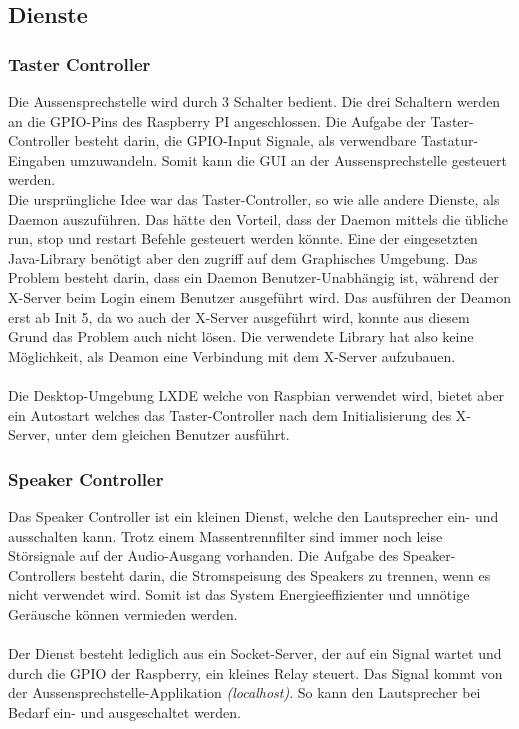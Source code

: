 \subsection{Dienste}
\label{kap:dienste}

\subsubsection{Taster Controller}
Die Aussensprechstelle wird durch 3 Schalter bedient. Die drei Schaltern werden an die GPIO-Pins des Raspberry PI angeschlossen. Die Aufgabe der Taster-Controller besteht darin, die GPIO-Input Signale, als verwendbare Tastatur-Eingaben umzuwandeln. Somit kann die GUI an der Aussensprechstelle gesteuert werden.
\\
Die ursprüngliche Idee war das Taster-Controller, so wie alle andere Dienste, als Daemon auszuführen. Das hätte den Vorteil, dass der Daemon mittels die übliche run, stop und restart Befehle gesteuert werden könnte. Eine der eingesetzten Java-Library benötigt aber den zugriff auf dem Graphisches Umgebung. Das Problem besteht darin, dass ein Daemon Benutzer-Unabhängig ist, während der X-Server beim Login einem Benutzer ausgeführt wird. Das ausführen der Deamon erst ab Init 5, da wo auch der X-Server ausgeführt wird, konnte aus diesem Grund das Problem auch nicht lösen.
Die verwendete Library hat also keine Möglichkeit, als Deamon eine Verbindung mit dem X-Server aufzubauen.
\\\\
Die Desktop-Umgebung LXDE welche von Raspbian verwendet wird, bietet aber ein Autostart welches das Taster-Controller nach dem Initialisierung des X-Server, unter dem gleichen Benutzer ausführt.

\subsubsection{Speaker Controller}
Das Speaker Controller ist ein kleinen Dienst, welche den Lautsprecher ein- und ausschalten kann. Trotz einem Massentrennfilter sind immer noch leise Störsignale auf der Audio-Ausgang vorhanden.
Die Aufgabe des Speaker-Controllers besteht darin, die Stromspeisung des Speakers zu trennen, wenn es nicht verwendet wird. Somit ist das System Energieeffizienter und unnötige Geräusche können vermieden werden.
\\
\\
Der Dienst besteht lediglich aus ein Socket-Server, der auf ein Signal wartet und durch die GPIO der Raspberry, ein kleines Relay steuert.
Das Signal kommt von der Aussensprechstelle-Applikation \textit{(localhost)}. So kann den Lautsprecher bei Bedarf ein- und ausgeschaltet werden.


